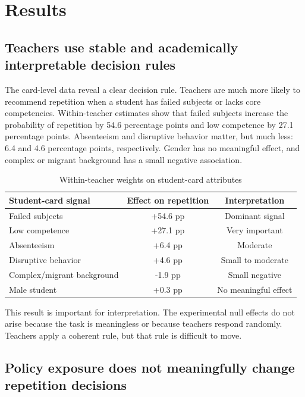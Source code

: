 \documentclass[12pt,a4paper]{article}
\begin{document}
\section{Results}

\subsection{Teachers use stable and academically interpretable decision rules}

The card-level data reveal a clear decision rule. Teachers are much more likely to recommend repetition when a student has failed subjects or lacks core competencies. Within-teacher estimates show that failed subjects increase the probability of repetition by 54.6 percentage points and low competence by 27.1 percentage points. Absenteeism and disruptive behavior matter, but much less: 6.4 and 4.6 percentage points, respectively. Gender has no meaningful effect, and complex or migrant background has a small negative association.

\begin{table}[htbp]
\centering
\caption{Within-teacher weights on student-card attributes}
\begin{tabular}{lcc}
\toprule
Student-card signal & Effect on repetition & Interpretation \\
\midrule
Failed subjects & +54.6 pp & Dominant signal \\
Low competence & +27.1 pp & Very important \\
Absenteeism & +6.4 pp & Moderate \\
Disruptive behavior & +4.6 pp & Small to moderate \\
Complex/migrant background & -1.9 pp & Small negative \\
Male student & +0.3 pp & No meaningful effect \\
\bottomrule
\end{tabular}
\end{table}

This result is important for interpretation. The experimental null effects do not arise because the task is meaningless or because teachers respond randomly. Teachers apply a coherent rule, but that rule is difficult to move.

\subsection{Policy exposure does not meaningfully change repetition decisions}
\end{document}
